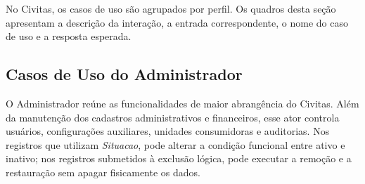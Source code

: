 No Civitas, os casos de uso são agrupados por perfil. Os quadros desta seção apresentam a descrição da interação, a entrada correspondente, o nome do caso de uso e a resposta esperada.

\subsection{Casos de Uso do Administrador}

O Administrador reúne as funcionalidades de maior abrangência do Civitas. Além da manutenção dos cadastros administrativos e financeiros, esse ator controla usuários, configurações auxiliares, unidades consumidoras e auditorias. Nos registros que utilizam \textit{Situacao}, pode alterar a condição funcional entre ativo e inativo; nos registros submetidos à exclusão lógica, pode executar a remoção e a restauração sem apagar fisicamente os dados.

